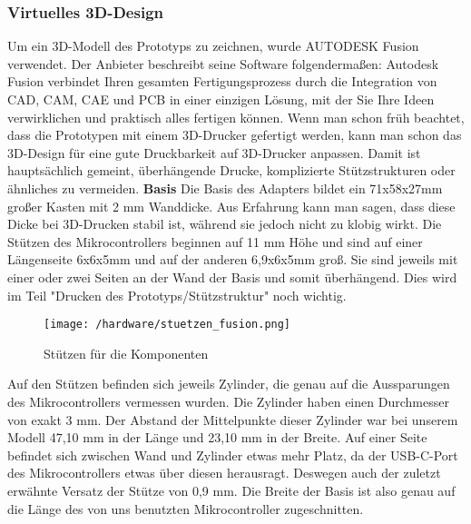\documentclass[11pt, twoside]{article}
\begin{document}
\subsubsection{Virtuelles 3D-Design}
Um ein 3D-Modell des Prototyps zu zeichnen, wurde AUTODESK Fusion verwendet. Der Anbieter beschreibt seine Software folgendermaßen: \glqq Autodesk Fusion verbindet Ihren gesamten Fertigungsprozess durch die Integration von CAD, CAM, CAE und PCB in einer einzigen Lösung, mit der Sie Ihre Ideen verwirklichen und praktisch alles fertigen können.\grqq{} \parencite{noauthor_urlnl12_nodate} \newline
Wenn man schon früh beachtet, dass die Prototypen mit einem 3D-Drucker gefertigt werden, kann man schon das 3D-Design für eine gute Druckbarkeit auf 3D-Drucker anpassen. Damit ist hauptsächlich gemeint, überhängende Drucke, komplizierte Stützstrukturen oder ähnliches zu vermeiden.
\vspace{4mm}\newline
\textbf{Basis} \newline
Die Basis des Adapters bildet ein 71x58x27mm großer Kasten mit 2 mm Wanddicke. Aus Erfahrung kann man sagen, dass diese Dicke bei 3D-Drucken stabil ist, während sie jedoch nicht zu klobig wirkt.\newline
Die Stützen des Mikrocontrollers beginnen auf 11 mm Höhe und sind auf einer Längenseite 6x6x5mm und auf der anderen 6,9x6x5mm groß. Sie sind jeweils mit einer oder zwei Seiten an der Wand der Basis und somit überhängend. Dies wird im Teil "Drucken des Prototyps/Stützstruktur" noch wichtig.\newline
\begin{figure}[H]
	\texttt{[image: /hardware/stuetzen\_fusion.png]}
	\caption{Stützen für die Komponenten}
\end{figure}
\noindent
Auf den Stützen befinden sich jeweils Zylinder, die genau auf die Aussparungen des Mikrocontrollers vermessen wurden. Die Zylinder haben einen Durchmesser von exakt 3 mm. Der Abstand der Mittelpunkte dieser Zylinder war bei unserem Modell 47,10 mm in der Länge und 23,10 mm in der Breite. Auf einer Seite befindet sich zwischen Wand und Zylinder etwas mehr Platz, da der USB-C-Port des Mikrocontrollers etwas über diesen herausragt. Deswegen auch der zuletzt erwähnte Versatz der Stütze von 0,9 mm.\newline
Die Breite der Basis ist also genau auf die Länge des von uns benutzten Mikrocontroller zugeschnitten.\newline
\end{document}
